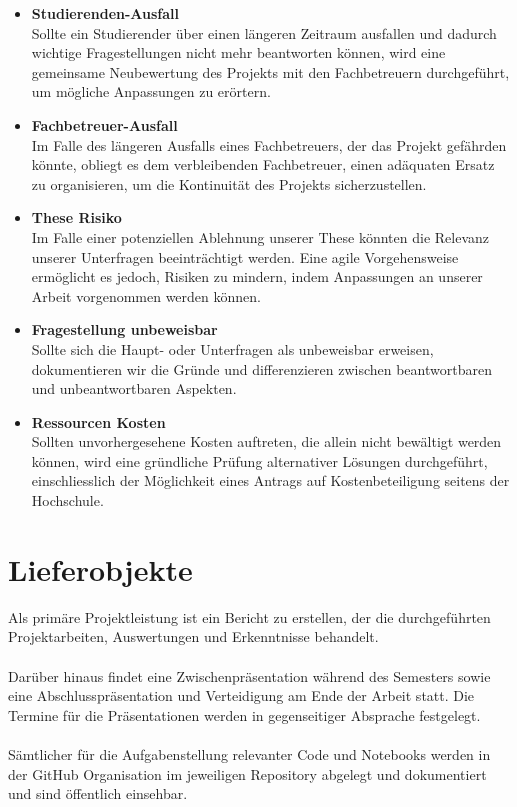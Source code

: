 \begin{itemize}
    \item \textbf{Studierenden-Ausfall} \\
    Sollte ein Studierender über einen längeren Zeitraum ausfallen und dadurch wichtige Fragestellungen nicht mehr beantworten können, wird eine gemeinsame Neubewertung des Projekts mit den Fachbetreuern durchgeführt, um mögliche Anpassungen zu erörtern.
    
    \item \textbf{Fachbetreuer-Ausfall} \\
    Im Falle des längeren Ausfalls eines Fachbetreuers, der das Projekt gefährden könnte, obliegt es dem verbleibenden Fachbetreuer, einen adäquaten Ersatz zu organisieren, um die Kontinuität des Projekts sicherzustellen.
    
    \item \textbf{These Risiko} \\
    Im Falle einer potenziellen Ablehnung unserer These könnten die Relevanz unserer Unterfragen beeinträchtigt werden. Eine agile Vorgehensweise ermöglicht es jedoch, Risiken zu mindern, indem Anpassungen an unserer Arbeit vorgenommen werden können.

    \item \textbf{Fragestellung unbeweisbar} \\
    Sollte sich die Haupt- oder Unterfragen als unbeweisbar erweisen, dokumentieren wir die Gründe und differenzieren zwischen beantwortbaren und unbeantwortbaren Aspekten.

    \item \textbf{Ressourcen Kosten} \\
    Sollten unvorhergesehene Kosten auftreten, die allein nicht bewältigt werden können, wird eine gründliche Prüfung alternativer Lösungen durchgeführt, einschliesslich der Möglichkeit eines Antrags auf Kostenbeteiligung seitens der Hochschule.
    
\end{itemize}
\newpage
\section{Lieferobjekte}
Als primäre Projektleistung ist ein Bericht zu erstellen, der die durchgeführten Projektarbeiten, Auswertungen und Erkenntnisse behandelt. \\\\
Darüber hinaus findet eine Zwischenpräsentation während des Semesters sowie eine Abschlusspräsentation und Verteidigung am Ende der Arbeit statt. Die Termine für die Präsentationen werden in gegenseitiger Absprache festgelegt. \\\\
Sämtlicher für die Aufgabenstellung relevanter Code und Notebooks werden in der GitHub Organisation im jeweiligen Repository abgelegt und dokumentiert und sind öffentlich einsehbar.

